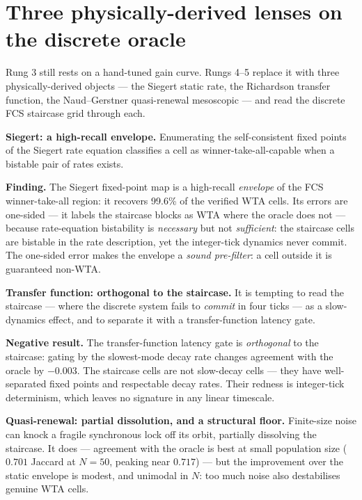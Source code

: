 \documentclass[conference]{IEEEtran}
\begin{document}
\section{Three physically-derived lenses on the discrete oracle}\label{sec:lenses}

Rung 3 still rests on a hand-tuned gain curve. Rungs 4--5 replace it with three
physically-derived objects --- the Siegert static rate, the Richardson transfer
function, the Naud--Gerstner quasi-renewal mesoscopic --- and read the discrete
FCS staircase grid through each.

\textbf{Siegert: a high-recall envelope.} Enumerating the self-consistent fixed
points of the Siegert rate equation classifies a cell as
winner-take-all-capable when a bistable pair of rates exists.

\par\smallskip\noindent\textbf{Finding.} The Siegert fixed-point map is a
high-recall \emph{envelope} of the FCS winner-take-all region: it recovers
99.6\% of the verified WTA cells. Its errors are one-sided --- it labels the
staircase blocks as WTA where the oracle does not --- because rate-equation
bistability is \emph{necessary} but not \emph{sufficient}: the staircase cells
are bistable in the rate description, yet the integer-tick dynamics never
commit. The one-sided error makes the envelope a \emph{sound pre-filter}: a cell
outside it is guaranteed non-WTA.
\par\smallskip

\textbf{Transfer function: orthogonal to the staircase.} It is tempting to read
the staircase --- where the discrete system fails to \emph{commit} in four
ticks --- as a slow-dynamics effect, and to separate it with a
transfer-function latency gate.

\par\smallskip\noindent\textbf{Negative result.} The transfer-function latency
gate is \emph{orthogonal} to the staircase: gating by the slowest-mode decay
rate changes agreement with the oracle by $-0.003$. The staircase cells are not
slow-decay cells --- they have well-separated fixed points and respectable
decay rates. Their redness is integer-tick determinism, which leaves no
signature in any linear timescale.
\par\smallskip

\textbf{Quasi-renewal: partial dissolution, and a structural floor.}
Finite-size noise can knock a fragile synchronous lock off its orbit, partially
dissolving the staircase. It does --- agreement with the oracle is best at small
population size ($0.701$ Jaccard at $N=50$, peaking near $0.717$) --- but the
improvement over the static envelope is modest, and unimodal in $N$: too much
noise also destabilises genuine WTA cells.
\end{document}
